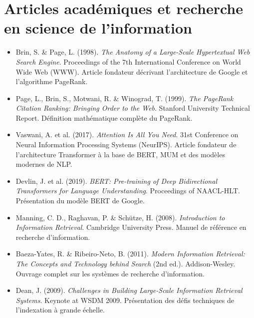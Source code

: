 \documentclass[12pt,a4paper,twoside]{report}
\begin{document}
\section*{Articles académiques et recherche en science de l'information}
\begin{itemize}
    \item Brin, S. \& Page, L. (1998). \textit{The Anatomy of a Large-Scale Hypertextual Web Search Engine}. Proceedings of the 7th International Conference on World Wide Web (WWW). Article fondateur décrivant l'architecture de Google et l'algorithme PageRank.
    \item Page, L., Brin, S., Motwani, R. \& Winograd, T. (1999). \textit{The PageRank Citation Ranking: Bringing Order to the Web}. Stanford University Technical Report. Définition mathématique complète du PageRank.
    \item Vaswani, A. et al. (2017). \textit{Attention Is All You Need}. 31st Conference on Neural Information Processing Systems (NeurIPS). Article fondateur de l'architecture Transformer à la base de BERT, MUM et des modèles modernes de NLP.
    \item Devlin, J. et al. (2019). \textit{BERT: Pre-training of Deep Bidirectional Transformers for Language Understanding}. Proceedings of NAACL-HLT. Présentation du modèle BERT de Google.
    \item Manning, C. D., Raghavan, P. \& Schütze, H. (2008). \textit{Introduction to Information Retrieval}. Cambridge University Press. Manuel de référence en recherche d'information.
    \item Baeza-Yates, R. \& Ribeiro-Neto, B. (2011). \textit{Modern Information Retrieval: The Concepts and Technology behind Search} (2nd ed.). Addison-Wesley. Ouvrage complet sur les systèmes de recherche d'information.
    \item Dean, J. (2009). \textit{Challenges in Building Large-Scale Information Retrieval Systems}. Keynote at WSDM 2009. Présentation des défis techniques de l'indexation à grande échelle.
\end{itemize}
\end{document}
